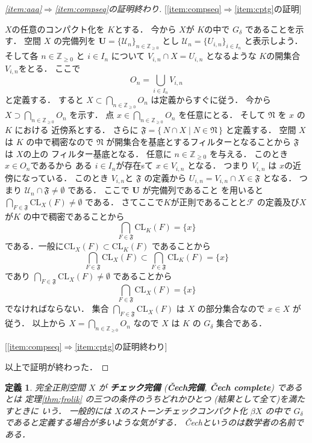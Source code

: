 \documentclass[leqno, a4paper, 12pt]{jsarticle}
\newtheorem{df}[thm]{定義}
\newcommand{\To}{\Longrightarrow}
\newcommand{\zz}{\mathbb{Z}}
\newcommand{\cl}{\mathrm{CL}}
\begin{document}
\begin{proof}
[\ref{item:aaa}$\To$\ref{item:compseq}の証明終わり]


[\ref{item:compseq}$\To$\ref{item:cptg}の証明]

$X$の任意のコンパクト化を
$K$とする．
今から
$X$が
$K$の中で
$G_{\delta}$
であることを示す．
空間
$X$
の完備列を
$\mathbf{U}=\{\mathcal{U}_{n}\}_{n\in \zz_{\ge 0}}$
とし
$\mathcal{U}_{n}=\{U_{i, n}\}_{i\in I_{n}}$
と表示しよう．
そして各
$n\in \zz_{\ge 0}$
と
$i\in I_{n}$
について
$V_{i, n}\cap X=U_{i, n}$
となるような
$K$の開集合
$V_{i, n}$をとる．
ここで
\[
O_{n}=\bigcup_{i\in I_{n}}V_{i, n}
\]
と定義する．
すると
$X\subset \bigcap_{n\in \zz_{\ge 0}}O_{n}$
は定義からすぐに従う．
今から
$X\supset \bigcap_{n\in \zz_{\ge 0}}O_{n}$
を示す．
点
$x\in \bigcap_{n\in \zz_{\ge 0}}O_{n}$
を任意にとる．
そして
$\mathfrak{N}$
を
$x$
の
$K$
における
近傍系とする．
さらに
$\mathfrak{F}=\{\, N \cap X\mid N\in \mathfrak{N}\, \}$
と定義する．
空間
$X$
は
$K$
の中で稠密なので
$\mathfrak{N}$
が開集合を基底とするフィルターとなることから
$\mathfrak{F}$
は
$X$の上の
フィルター基底となる．
任意に
$n\in \zz_{\ge 0}$
を与える．
このとき
$x\in O_{n}$であるから
ある
$i\in I_{n}$が存在sて
$x\in V_{i, n}$
となる．
つまり
$V_{i,n}$
は
$x$の近傍になっている．
このとき
$V_{i, n}$と
$\mathfrak{F}$
の定義から
$U_{i, n}=V_{i, n}\cap X\in \mathfrak{F}$
となる．
つまり
$\mathcal{U}_{n}\cap \mathfrak{F}\neq \emptyset$
である．
ここで
$\mathbf{U}$
が完備列であること
を用いると
$\bigcap_{F\in \mathfrak{F}}\cl_{X}(F)\neq \emptyset$
である．
さてここで$K$が正則であることと$\mathcal{F}$
の定義及び$X$が$K$
の中で稠密であることから
\[
\bigcap_{F\in \mathfrak{F}}\cl_{K}(F)=\{x\}
\]
である．一般に$\cl_{X}(F)\subset \cl_{K}(F)$
であることから
\[
\bigcap_{F\in \mathfrak{F}}\cl_{X}(F)
\subset 
\bigcap_{F\in \mathfrak{F}}\cl_{K}(F)=\{x\}
\]
であり
$\bigcap_{F\in \mathfrak{F}}\cl_{X}(F)\neq \emptyset$
であることから
\[
\bigcap_{F\in \mathfrak{F}}\cl_{X}(F)=\{x\}
\]
でなければならない．
集合
$\bigcap_{F\in \mathfrak{F}}\cl_{X}(F)$
は
$X$
の部分集合なので
$x\in X$
が従う．
以上から
$X=\bigcap_{n\in \zz_{\ge 0}}O_{n}$
なので
$X$
は
$K$
の
$G_{\delta}$
集合である．

[\ref{item:compseq}$\To$\ref{item:cptg}の証明終わり]

以上で証明が終わった．
\end{proof}

\begin{df}
完全正則空間
$X$
が
\textbf{チェック完備}
(\textbf{\v{C}ech完備}, 
\textbf{\v{C}ech complete})
であるとは
定理\ref{thm:frolik}
の三つの条件のうちどれかひとつ
(結果として全て)を満たすときに
いう．
一般的には
$X$のストーンチェックコンパクト化
$\beta X$
の中で
$G_{\delta}$
であると定義する場合が多いような気がする．
\v{C}echというのは数学者の名前である．
\end{df}
\end{document}
